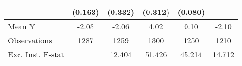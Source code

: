 {\begin{tabular}{l*{5}{c}}
            &     (0.163)         &     (0.332)         &     (0.312)         &     (0.080)         &                     \\
\midrule
Mean Y      &       -2.03         &       -2.06         &        4.02         &        0.10         &       -2.10         \\
Observations&        1287         &        1259         &        1300         &        1250         &        1210         \\
Exc. Inst. F-stat&                     &      12.404         &      51.426         &      45.214         &      14.712         \\
\bottomrule
\end{tabular}
}
